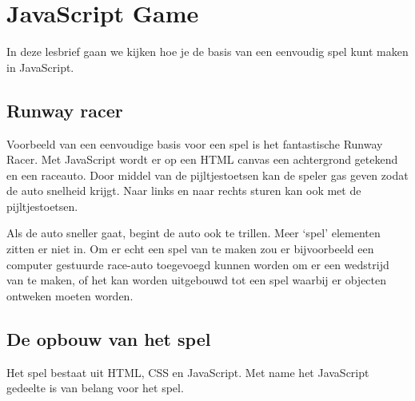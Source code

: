 \documentclass[a4paper]{report}
\begin{document}
\chapter*{\textcolor{seccol}{JavaScript} Game}
In deze lesbrief gaan we kijken hoe je de basis van een eenvoudig spel kunt maken in JavaScript.

\section*{Runway racer}
Voorbeeld van een eenvoudige basis voor een spel is het fantastische Runway Racer. Met JavaScript wordt er op een HTML canvas een achtergrond getekend en een raceauto. Door middel van de pijltjestoetsen kan de speler gas geven zodat de auto snelheid krijgt. Naar links en naar rechts sturen kan ook met de pijltjestoetsen. 

Als de auto sneller gaat, begint de auto ook te trillen. Meer `spel' elementen zitten er niet in. Om er echt een spel van te maken zou er bijvoorbeeld een computer gestuurde race-auto toegevoegd kunnen worden om er een wedstrijd van te maken, of het kan worden uitgebouwd tot een spel waarbij er objecten ontweken moeten worden.

\begin{center}
\end{center}

\section*{De opbouw van het spel}
Het spel bestaat uit HTML, CSS en JavaScript. Met name het JavaScript gedeelte is van belang voor het spel.
\end{document}
